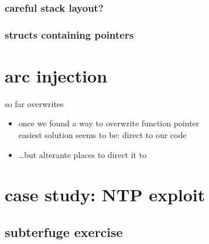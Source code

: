 \subsubsection{careful stack layout?}


\subsubsection{structs containing pointers}


\section{arc injection}
\begin{frame}{so far overwrites}
    \begin{itemize}
    \item once we found a way to overwrite function pointer\\
          easiest solution seems to be: direct to our code
    \item \ldots but alterante places to direct it to
    \end{itemize}
\end{frame}



\section{case study: NTP exploit}


\subsection{subterfuge exercise}


